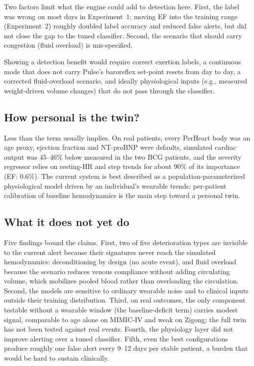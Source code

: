 \documentclass[conference]{IEEEtran}
\begin{document}
Two factors limit what the engine could add to detection here. First, the label was wrong on most days in Experiment~1; moving EF into the training range (Experiment~2) roughly doubled label accuracy and reduced false alerts, but did not close the gap to the tuned classifier. Second, the scenario that should carry congestion (fluid overload) is mis-specified.

Showing a detection benefit would require correct exertion labels, a continuous mode that does not carry Pulse's baroreflex set-point resets from day to day, a corrected fluid-overload scenario, and ideally physiological inputs (e.g., measured weight-driven volume changes) that do not pass through the classifier.

\subsection{How personal is the twin?}
Less than the term usually implies. On real patients, every PerHeart body was an age proxy, ejection fraction and NT-proBNP were defaults, simulated cardiac output was 45--46\% below measured in the two BCG patients, and the severity regressor relies on resting-HR and step trends for about 90\% of its importance (EF: 0.6\%). The current system is best described as a population-parameterized physiological model driven by an individual's wearable trends; per-patient calibration of baseline hemodynamics is the main step toward a personal twin.

\subsection{What it does not yet do}
Five findings bound the claims. First, two of five deterioration types are invisible to the current alert because their signatures never reach the simulated hemodynamics: deconditioning by design (no acute event), and fluid overload because the scenario reduces venous compliance without adding circulating volume, which mobilizes pooled blood rather than overloading the circulation. Second, the models are sensitive to ordinary wearable noise and to clinical inputs outside their training distribution. Third, on real outcomes, the only component testable without a wearable window (the baseline-deficit term) carries modest signal, comparable to age alone on MIMIC-IV and weak on Zigong; the full twin has not been tested against real events. Fourth, the physiology layer did not improve alerting over a tuned classifier. Fifth, even the best configurations produce roughly one false alert every 9--12 days per stable patient, a burden that would be hard to sustain clinically.
\end{document}
